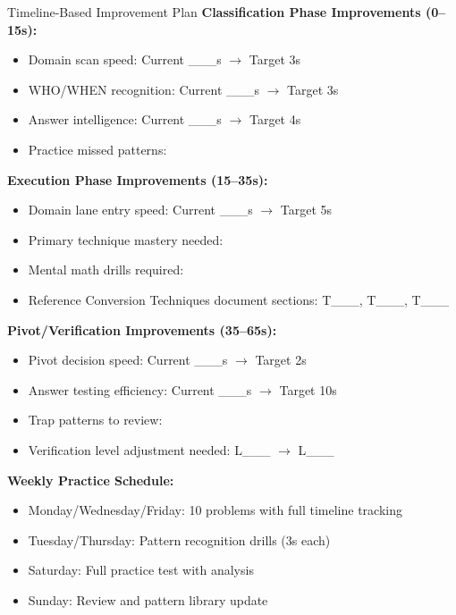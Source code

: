 \documentclass{article}
\begin{document}
\begin{analysisbox}{Timeline-Based Improvement Plan}
\textbf{Classification Phase Improvements (0--15s):}
\begin{itemize}[nosep]
\item[$\square$] Domain scan speed: Current \_\_\_s $\rightarrow$ Target 3s
\item[$\square$] WHO/WHEN recognition: Current \_\_\_s $\rightarrow$ Target 3s
\item[$\square$] Answer intelligence: Current \_\_\_s $\rightarrow$ Target 4s
\item[$\square$] Practice missed patterns: \underline{\hspace{3cm}}
\end{itemize}

\textbf{Execution Phase Improvements (15--35s):}
\begin{itemize}[nosep]
\item[$\square$] Domain lane entry speed: Current \_\_\_s $\rightarrow$ Target 5s
\item[$\square$] Primary technique mastery needed: \underline{\hspace{3cm}}
\item[$\square$] Mental math drills required: \underline{\hspace{3cm}}
\item[$\square$] Reference Conversion Techniques document sections: T\_\_\_, T\_\_\_, T\_\_\_
\end{itemize}

\textbf{Pivot/Verification Improvements (35--65s):}
\begin{itemize}[nosep]
\item[$\square$] Pivot decision speed: Current \_\_\_s $\rightarrow$ Target 2s
\item[$\square$] Answer testing efficiency: Current \_\_\_s $\rightarrow$ Target 10s
\item[$\square$] Trap patterns to review: \underline{\hspace{3cm}}
\item[$\square$] Verification level adjustment needed: L\_\_\_ $\rightarrow$ L\_\_\_
\end{itemize}

\textbf{Weekly Practice Schedule:}
\begin{itemize}[nosep]
\item[$\square$] Monday/Wednesday/Friday: 10 problems with full timeline tracking
\item[$\square$] Tuesday/Thursday: Pattern recognition drills (3s each)
\item[$\square$] Saturday: Full practice test with analysis
\item[$\square$] Sunday: Review and pattern library update
\end{itemize}


\end{analysisbox}
\end{document}
